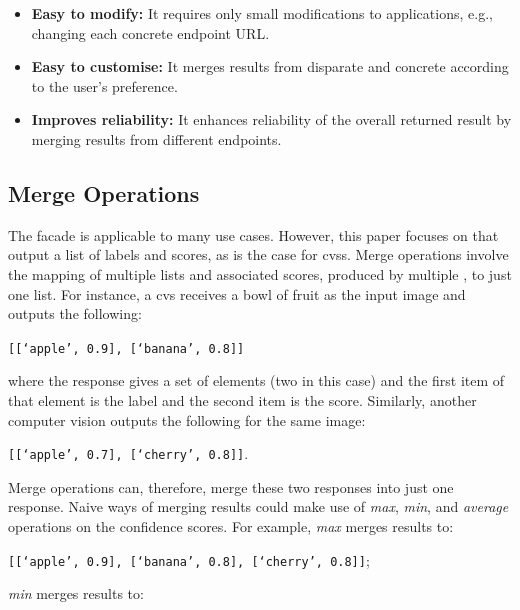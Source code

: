 \begin{itemize}
\item \textbf{Easy to modify:} It requires only small modifications to applications, e.g., changing each concrete endpoint URL.
\item \textbf{Easy to customise:} It merges results from disparate and concrete  according to the user's preference.
\item \textbf{Improves reliability:} It enhances reliability of the overall returned result by merging results from different endpoints.
\end{itemize}

\subsection{Merge Operations}\label{icwe2019:sec:merge-operations}

The  facade is applicable to many use cases.
However, this paper focuses on  that output a list of labels and scores, as is the case for \glspl{cvs}.
Merge operations involve the mapping of multiple lists and associated scores, produced by multiple , to just one list.
For instance, a \gls{cvs} receives a bowl of fruit as the input image and outputs the following:

\begin{center}
  \texttt{[[`apple', 0.9], [`banana', 0.8]]}
\end{center}

\noindent
where the response gives a set of elements (two in this case) and the first item of that element is the label and the second item is the score. Similarly, another computer vision  outputs the following for the same image:

\begin{center}
  \texttt{[[`apple', 0.7], [`cherry', 0.8]]}.  
\end{center}

\noindent
Merge operations can, therefore, merge these two responses into just one response. Naive ways of merging results could make use of \textit{max}, \textit{min}, and \textit{average} operations on the confidence scores. For example, \textit{max} merges results to:

\begin{center}
  \texttt{[[`apple', 0.9], [`banana', 0.8], [`cherry', 0.8]]};
\end{center}

\noindent
\textit{min} merges results to:

